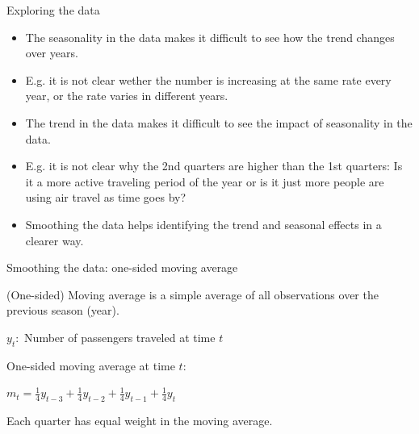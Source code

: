 \documentclass{beamer}\usepackage[]{graphicx}\usepackage[]{color}
\begin{document}
\begin{darkframes}
\begin{frame}[fragile]{Exploring the data}
\begin{itemize}[<+->]
        \item The seasonality in the data makes it difficult to see how the trend changes over years.
        
        \item E.g. it is not clear wether the number is increasing at the same rate every year, or the rate varies in different years. 
        
        \item The trend in the data makes it difficult to see the impact of seasonality in the data. 
        
        \item E.g. it is not clear why the 2nd quarters are higher than the 1st quarters: Is it a more active traveling period of the year or is it just more people are using air travel as time goes by?
        
        \item Smoothing the data helps identifying the trend and seasonal effects in a clearer way.
        
        \lc
      \end{itemize}
    \end{frame}
    
    
    
    \begin{frame}[fragile]{Smoothing the data: one-sided moving average}
    \fontsize{9}{9}\selectfont
        
        \alert{(One-sided) Moving average} is a simple average of all observations over the previous season (year).
        
        \begin{center}
          $y_t:$ Number of passengers traveled at time $t$
        \end{center}  
        
        One-sided moving average at time $t$:
        
        \begin{center}
          $m_t = \frac{1}{4} y_{t-3} + \frac{1}{4} y_{t-2} + \frac{1}{4} y_{t-1} + \frac{1}{4} y_{t}$
        \end{center}  
        Each quarter has equal weight in the moving average.
        
    \end{frame}
    
    
    

\end{darkframes}
\end{document}
